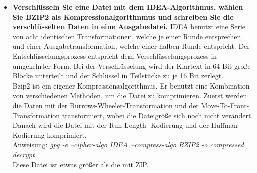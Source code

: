 \documentclass[12pt,a4paper]{article}
\begin{document}
\begin{itemize}
    \item \textbf{Verschlüsseln Sie eine Datei mit dem IDEA-Algorithmus, wählen Sie BZIP2 als Kompressionalgorithnmus und schreiben Sie die verschlüsselten Daten in eine Ausgabedatei.}
    IDEA benutzt eine Serie von acht identischen Transformationen, welche je einer Runde entsprechen, und einer Ausgabetransformation, welche einer halben Runde entspricht. Der Entschlüsselungsprozess entspricht dem Verschlüsselungsprozess in umgekehrter Form. Bei der Verschlüsselung wird der Klartext in 64 Bit große Blöcke unterteilt und der Schlüssel in Teilstücke zu je 16 Bit zerlegt. \\
    Bzip2 ist ein eigener Kompressionsalgorithmus. Er benutzt eine Kombination von verschiedenen Methoden, um die Datei zu komprimieren. Zuerst werden die Daten mit der Burrows-Wheeler-Transformation und der Move-To-Front-Transformation transformiert, wobei die Dateigröße sich noch nicht verändert. Danach wird die Datei mit der Run-Length- Kodierung und der Huffman-Kodierung komprimiert.\\
    
    Anweisung: \textit{gpg -e --cipher-algo IDEA --compress-algo BZIP2 -o compressed decrypt} \\
    Diese Datei ist etwas größer als die mit ZIP.
    
\end{itemize}
\end{document}
